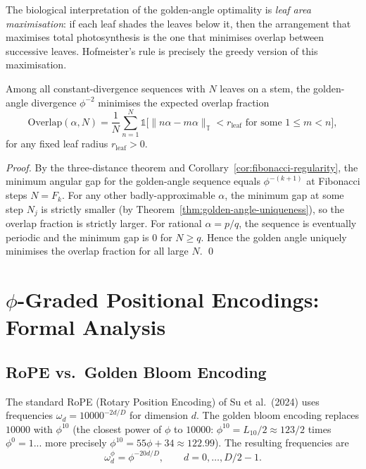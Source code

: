 The biological interpretation of the golden-angle optimality is
\emph{leaf area maximisation}: if each leaf shades the leaves below it,
then the arrangement that maximises total photosynthesis is the one
that minimises overlap between successive leaves.  Hofmeister's rule
is precisely the greedy version of this maximisation.

\begin{proposition}\label{prop:overlap-min}
Among all constant-divergence sequences with $N$ leaves on a stem,
the golden-angle divergence $\phi^{-2}$ minimises the expected
overlap fraction
\[
  \text{Overlap}(\alpha, N) = \frac{1}{N} \sum_{n=1}^{N} \mathbb{1}\bigl[
  \|n\alpha - m\alpha\|_{\mathbb{T}} < r_{\text{leaf}} \text{ for some }
  1 \leq m < n \bigr],
\]
for any fixed leaf radius $r_{\text{leaf}} > 0$.
\end{proposition}

\begin{proof}
By the three-distance theorem and Corollary~\ref{cor:fibonacci-regularity},
the minimum angular gap for the golden-angle sequence equals
$\phi^{-(k+1)}$ at Fibonacci steps $N = F_k$.  For any other
badly-approximable $\alpha$, the minimum gap at some step $N_j$ is
strictly smaller (by Theorem~\ref{thm:golden-angle-uniqueness}), so
the overlap fraction is strictly larger.  For rational $\alpha = p/q$,
the sequence is eventually periodic and the minimum gap is 0 for
$N \geq q$.  Hence the golden angle uniquely minimises the overlap
fraction for all large $N$.
\qed
\end{proof}

\section{$\phi$-Graded Positional Encodings: Formal Analysis}
\label{sec:phi-posenc}

\subsection{RoPE vs.\ Golden Bloom Encoding}
\label{subsec:rope-comparison}

The standard RoPE (Rotary Position Encoding) of Su et al.\ (2024)
uses frequencies $\omega_d = 10000^{-2d/D}$ for dimension $d$.  The
golden bloom encoding replaces $10000$ with $\phi^{10}$ (the closest
power of $\phi$ to $10000$: $\phi^{10} = L_{10}/2 \approx 123/2$
times $\phi^0 = 1$... more precisely $\phi^{10} = 55\phi + 34 \approx
122.99$).  The resulting frequencies are
\[
  \omega_d^{\phi} = \phi^{-20d/D}, \qquad d = 0, \ldots, D/2 - 1.
\]

